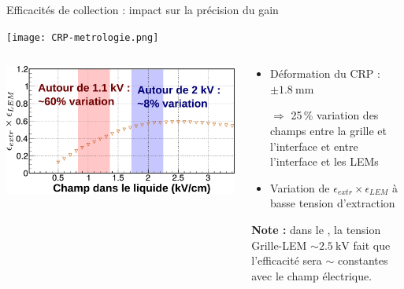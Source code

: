     \begin{frame}{Efficacités de collection : impact sur la précision du gain}
        \begin{center} \vspace{-0.5cm}\texttt{[image: CRP-metrologie.png]} \end{center}
        \begin{scriptsize}
            \begin{columns}
                \begin{column}{0.6\textwidth}
                    \centering \includegraphics[width=\textwidth]{./pictures/extr_eff.pdf}
                \end{column}\hfill
                \begin{column}{0.4\textwidth}
                    \begin{itemize}
       					\item Déformation du CRP : $\pm\SI{1.8}{\milli\meter}$
       					\item[$\Rightarrow$]  25\,\% variation des champs entre la grille et l'interface et entre l'interface et les LEMs
       					\item Variation de $\epsilon_{extr}\times\epsilon_{LEM}$ à basse tension d'extraction
       				\end{itemize}
                     \textbf{Note : } dans le \SSS{}, la tension Grille-LEM $\sim\SI{2.5}{\kilo\volt}$ fait que l'efficacité sera $\sim$ constantes avec le champ électrique.
                \end{column}
            \end{columns}
        \end{scriptsize}
    \end{frame}


